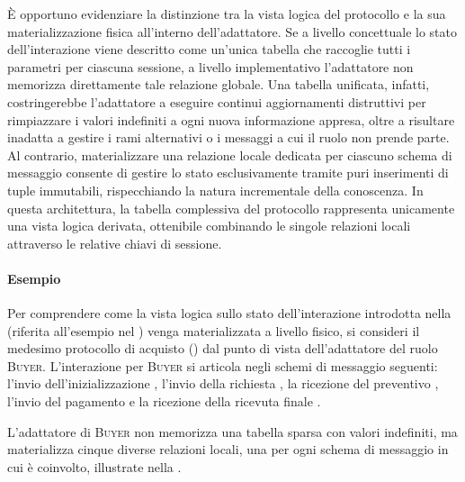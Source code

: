 È opportuno evidenziare la distinzione tra la vista logica del protocollo e la sua materializzazione fisica all'interno dell'adattatore. Se
a livello concettuale lo stato dell'interazione viene descritto come un'unica tabella che raccoglie tutti i parametri per ciascuna
sessione, a livello implementativo l'adattatore non memorizza direttamente tale relazione globale. Una tabella unificata, infatti,
costringerebbe l'adattatore a eseguire continui aggiornamenti distruttivi per rimpiazzare i valori indefiniti a ogni nuova
informazione appresa, oltre a risultare inadatta a gestire i rami alternativi o i messaggi a cui il ruolo non prende parte. Al contrario,
materializzare una relazione locale dedicata per ciascuno schema di messaggio consente di gestire lo stato esclusivamente tramite puri
inserimenti di tuple immutabili, rispecchiando la natura incrementale della conoscenza. In questa architettura, la tabella complessiva del 
protocollo rappresenta unicamente una vista logica derivata, ottenibile combinando le singole relazioni locali attraverso le relative chiavi
di sessione.

\paragraph{Esempio}

Per comprendere come la vista logica sullo stato dell'interazione introdotta nella  (riferita all'esempio nel )
venga materializzata a livello fisico, si consideri il medesimo protocollo di acquisto () dal punto di vista dell'adattatore del ruolo \textsc{Buyer}.
L'interazione per \textsc{Buyer} si articola negli schemi di messaggio seguenti: l'invio dell'inizializzazione , l'invio della richiesta ,
la ricezione del preventivo , l'invio del pagamento  e la ricezione della ricevuta finale 
.

L'adattatore di \textsc{Buyer} non memorizza una tabella sparsa con valori indefiniti, ma materializza cinque diverse relazioni locali,
una per ogni schema di messaggio in cui è coinvolto, illustrate nella .

